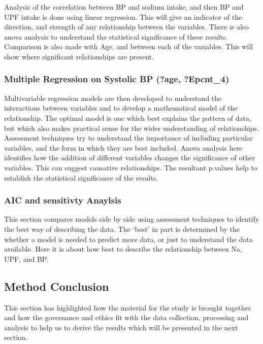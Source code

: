 \documentclass[
]{article}
\begin{document}
Analysis of the correlation between BP and sodium intake, and then BP
and UPF intake is done using linear regression. This will give an
indicator of the direction, and strength of any relationship between the
variables. There is also anova analysis to understand the statistical
significance of these results. Comparison is also made with Age, and
between each of the variables. This will show where significant
relationships are present.

\hypertarget{multiple-regression-on-systolic-bp-age-epcnt_4}{%
\subsubsection{Multiple Regression on Systolic BP (?age,
?Epcnt\_4)}\label{multiple-regression-on-systolic-bp-age-epcnt_4}}

Multivariable regression models are then developed to understand the
interactions between variables and to develop a mathematical model of
the relationship. The optimal model is one which best explains the
pattern of data, but which also makes practical sense for the wider
understanding of relationships. Assessment techniques try to understand
the importance of including particular variables, and the form in which
they are best included. Anova analysis here identifies how the addition
of different variables changes the significance of other variables. This
can suggest causative relationships. The resultant p.values help to
establish the statistical significance of the results.

\hypertarget{aic-and-sensitivty-anaylsis}{%
\subsubsection{AIC and sensitivty
Anaylsis}\label{aic-and-sensitivty-anaylsis}}

This section compares models side by side using assessment techniques to
identify the best way of describing the data. The `best' in part is
determined by the whether a model is needed to predict more data, or
just to understand the data available. Here it is about how best to
describe the relationship between Na, UPF, and BP.

\hypertarget{method-conclusion}{%
\subsection{Method Conclusion}\label{method-conclusion}}

This section has highlighted how the material for the study is brought
together and how the governance and ethics fit with the data collection,
processing and analysis to help us to derive the results which will be
presented in the next section.
\end{document}
